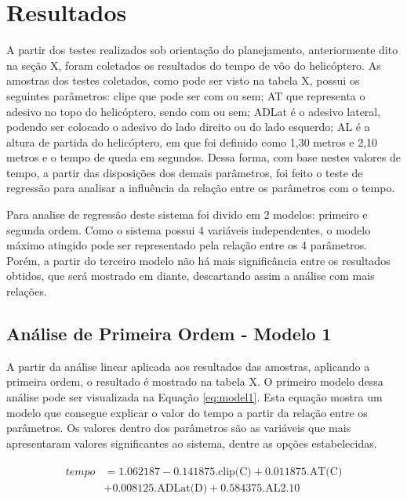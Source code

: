 \section{Resultados}

A partir dos testes realizados sob orientação do planejamento, anteriormente dito na seção X, foram coletados os resultados do tempo de vôo do helicóptero. As amostras dos testes coletados, como pode ser visto na tabela X, possui os seguintes parâmetros: clipe que pode ser com ou sem; AT que representa o adesivo no topo do helicóptero, sendo com ou sem; ADLat é o adesivo lateral, podendo ser colocado o adesivo do lado direito ou do lado esquerdo; AL é a altura de partida do helicóptero, em que foi definido como 1,30 metros e 2,10 metros e o tempo de queda em segundos. Dessa forma, com base nestes valores de tempo, a partir das disposições dos demais parâmetros, foi feito o teste de regressão para analisar a influência da relação entre os parâmetros com o tempo.


Para analise de regressão deste sistema foi divido em 2 modelos: primeiro e segunda ordem. Como o sistema possui 4 variáveis independentes, o modelo máximo atingido pode ser representado pela relação entre os 4 parâmetros. Porém, a partir do terceiro modelo não há mais significância entre os resultados obtidos, que será mostrado em diante, descartando assim a análise com mais relações. 

\subsection{Análise de Primeira Ordem - Modelo 1}

A partir da análise linear aplicada aos resultados das amostras, aplicando a primeira ordem, o resultado é mostrado na tabela X. O primeiro modelo dessa análise pode ser visualizada na Equação \ref{eq:model1}. Esta equação mostra um modelo que consegue explicar o valor do tempo a partir da relação entre os parâmetros. Os valores dentro dos parâmetros são as variáveis que mais apresentaram valores significantes ao sistema, dentre as opções estabelecidas. 


\begin{align}
    \begin{split}
    tempo &= 1.062187 - 0.141875\text{.clip(C)} + 0.011875\text{.AT(C)} \\
    & + 0.008125\text{.ADLat(D)} + 0.584375\text{.AL2.10}
    \end{split}
    \label{eq:model1}
\end{align}

